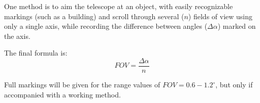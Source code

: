 One method is to aim the telescope at an object, with easily recognizable
markings (such as a building) and scroll through several ($n$) fields of
view using only a single axis, while recording the difference between angles
($\Delta\alpha$) marked on the axis.

The final formula is:
\[
FOV = \frac{\Delta\alpha}{n}
\]

Full markings will be given for the range values of
$FOV = 0.6-1.2^\circ$, but only if accompanied with a working method.
